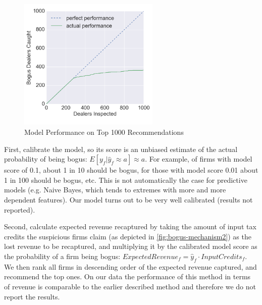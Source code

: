 \begin{figure}[t!]
  \includegraphics[width=0.6\textwidth]{graphs/PerformanceAllData_v2.png}
  \caption{Model Performance on Top 1000 Recommendations}
  \label{fig:AllDataPerformanceTop1000}
\end{figure}
First, calibrate the model, so its score is an unbiased estimate of the actual probability of being bogus: $E[y_f|\hat{y}_f\approx a]\approx a$. For example, of firms with model score of 0.1, about 1 in 10 should be bogus, for those with model score  0.01 about 1 in 100 should be bogus, etc. This is not automatically the case for predictive models (e.g. Naive Bayes, which tends to extremes with more and more dependent features). Our model turns out to be very well calibrated (results not reported).

Second, calculate expected revenue recaptured by taking the amount of input tax credits the suspicious firms claim (as depicted in \cref{fig:bogus-mechanism2}) as the lost revenue to be recaptured, and multiplying it by the calibrated model score as the probability of a firm being bogus: $ExpectedRevenue_f=\hat{y}_f\cdot InputCredits_f$. We then rank all firms in descending order of the expected revenue captured, and recommend the top ones. On our data the performance of this method in terms of revenue is comparable to the earlier described method and therefore we do not report the results.


